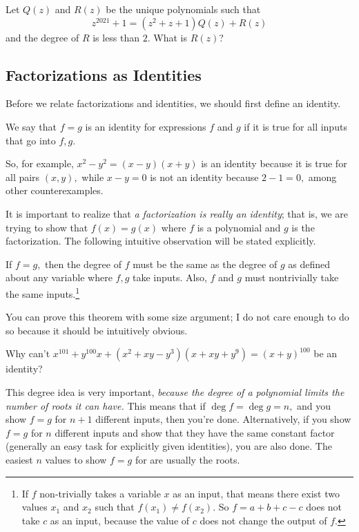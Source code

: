 \documentclass[mast]{lucky}
\begin{document}
\begin{exam}[AMC 12B 2021/20]
Let $Q(z)$ and $R(z)$ be the unique polynomials such that
\[z^{2021}+1=(z^2+z+1)Q(z)+R(z)\]
and the degree of $R$ is less than $2$. What is $R(z)$?
\end{exam}

\subsection{Factorizations as Identities}

Before we relate factorizations and identities, we should first define an identity.

\begin{defi}[Identity]
We say that $f=g$ is an identity for expressions $f$ and $g$ if it is true for all inputs that go into $f,g$.
\end{defi}

So, for example, $x^2-y^2=(x-y)(x+y)$ is an identity because it is true for all pairs $(x,y),$ while $x-y=0$ is not an identity because $2-1=0,$ among other counterexamples.

It is important to realize that \emph{a factorization is really an identity}; that is, we are trying to show that $f(x)=g(x)$ where $f$ is a polynomial and $g$ is the factorization. The following intuitive observation will be stated explicitly.

\begin{theo}
If $f=g,$ then the degree of $f$ must be the same as the degree of $g$ as defined about any variable where $f,g$ take inputs. Also, $f$ and $g$ must nontrivially take the same inputs.\footnote{If $f$ non-trivially takes a variable $x$ as an input, that means there exist two values $x_1$ and $x_2$ such that $f(x_1)\neq f(x_2).$ So $f=a+b+c-c$ does not take $c$ as an input, because the value of $c$ does not change the output of $f.$}
\end{theo}

You can prove this theorem with some size argument; I do not care enough to do so because it should be intuitively obvious.

\begin{exer}
Why can't $x^{101}+y^{100}x+(x^2+xy-y^3)(x+xy+y^9)=(x+y)^{100}$ be an identity?
\end{exer}

This degree idea is very important, \emph{because the degree of a polynomial limits the number of roots it can have.} This means that if $\deg f=\deg g = n,$ and you show $f=g$ for $n+1$ different inputs, then you're done. Alternatively, if you show $f=g$ for $n$ different inputs and show that they have the same constant factor (generally an easy task for explicitly given identities), you are also done. The easiest $n$ values to show $f=g$ for are usually the roots.
\end{document}
